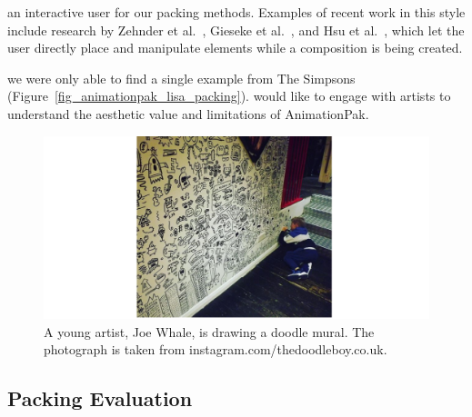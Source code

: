  an interactive user  for our packing methods.
Examples of recent work in this style include research
by Zehnder et al.~\cite{Zehnder2016}, Gieseke et al.~\cite{Gieseke2017}, 
and Hsu et al.~\cite{Hsu2020}, which let the user directly place and manipulate
elements while a composition is being created.

we were only able to find a single example from The Simpsons (Figure~\ref{fig_animationpak_lisa_packing}). 
 would like to engage with artists to understand the aesthetic value and limitations
of AnimationPak.

\begin{figure}
\centering
\includegraphics[width=1.0\textwidth]{figures/conclusions/doodle_boy.pdf}
\caption[A doodle mural by Joe Whale]
{ \label{doodle_boy} 
\newtext
{
A young artist, Joe Whale, is drawing a doodle mural. 
The photograph is taken from instagram.com/thedoodleboy.co.uk.
}
}
\end{figure}

\subsection{Packing Evaluation}

